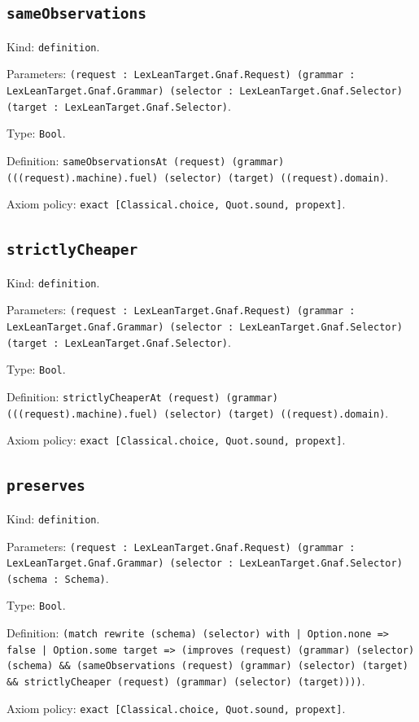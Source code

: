\documentclass[11pt]{article}
\begin{document}
\subsection*{\texttt{sameObservations}}
\noindent Kind: \texttt{definition}.\par
\noindent Parameters: \texttt{(request : LexLeanTarget.Gnaf.Request) (grammar : LexLeanTarget.Gnaf.Grammar) (selector : LexLeanTarget.Gnaf.Selector) (target : LexLeanTarget.Gnaf.Selector)}.\par
\noindent Type: \texttt{Bool}.\par
\noindent Definition: \texttt{sameObservationsAt (request) (grammar) (((request).machine).fuel) (selector) (target) ((request).domain)}.\par
\noindent Axiom policy: \texttt{exact [Classical.choice, Quot.sound, propext]}.\par
\subsection*{\texttt{strictlyCheaper}}
\noindent Kind: \texttt{definition}.\par
\noindent Parameters: \texttt{(request : LexLeanTarget.Gnaf.Request) (grammar : LexLeanTarget.Gnaf.Grammar) (selector : LexLeanTarget.Gnaf.Selector) (target : LexLeanTarget.Gnaf.Selector)}.\par
\noindent Type: \texttt{Bool}.\par
\noindent Definition: \texttt{strictlyCheaperAt (request) (grammar) (((request).machine).fuel) (selector) (target) ((request).domain)}.\par
\noindent Axiom policy: \texttt{exact [Classical.choice, Quot.sound, propext]}.\par
\subsection*{\texttt{preserves}}
\noindent Kind: \texttt{definition}.\par
\noindent Parameters: \texttt{(request : LexLeanTarget.Gnaf.Request) (grammar : LexLeanTarget.Gnaf.Grammar) (selector : LexLeanTarget.Gnaf.Selector) (schema : Schema)}.\par
\noindent Type: \texttt{Bool}.\par
\noindent Definition: \texttt{(match rewrite (schema) (selector) with | Option.none => false | Option.some target => (improves (request) (grammar) (selector) (schema) \&\& (sameObservations (request) (grammar) (selector) (target) \&\& strictlyCheaper (request) (grammar) (selector) (target))))}.\par
\noindent Axiom policy: \texttt{exact [Classical.choice, Quot.sound, propext]}.\par
\end{document}
